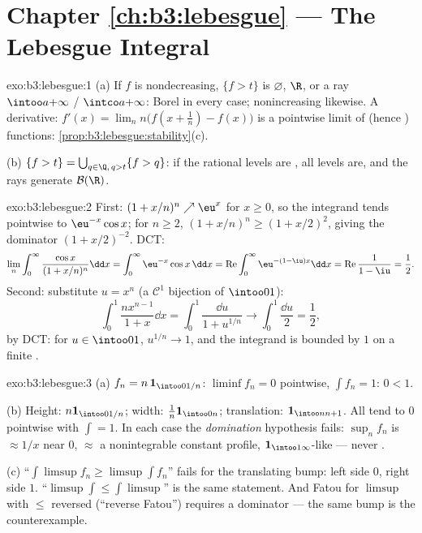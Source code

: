 \section*{Chapter \ref{ch:b3:lebesgue} --- The Lebesgue
Integral}

\begin{solution}{exo:b3:lebesgue:1}
(a) If $f$ is nondecreasing, $\{f > t\}$ is $\varnothing$, $\R$,
or a ray $\intoo a{+\infty}$ / $\intco a{+\infty}$: Borel in
every case; nonincreasing likewise. A derivative: $f'(x) =
\lim_n n\bigl(f(x + \frac1n) - f(x)\bigr)$ is a pointwise limit
of  (hence ) functions:
\cref{prop:b3:lebesgue:stability}(c).

(b) $\{f > t\} = \bigcup_{q \in \Q,\, q > t}\{f > q\}$: if the
rational levels are , all levels are, and the rays
generate $\mathcal B(\R)$.
\end{solution}

\begin{solution}{exo:b3:lebesgue:2}
First: $(1 + x/n)^n \nearrow \eu^x$ for $x \geq 0$, so the
integrand tends pointwise to $\eu^{-x}\cos x$; for $n \geq 2$,
$(1 + x/n)^n \geq (1 + x/2)^2$, giving the  dominator
$(1 + x/2)^{-2}$. DCT:
\[
\lim_n\int_0^\infty\frac{\cos x}{(1 + x/n)^n}\dd x
= \int_0^\infty \eu^{-x}\cos x\,\dd x
= \operatorname{Re}\int_0^\infty\eu^{-(1 - \iu)x}\dd x
= \operatorname{Re}\frac{1}{1 - \iu} = \frac12 .
\]
Second: substitute $u = x^n$ (a $\mathcal C^1$ bijection of
$\intoo01$):
\[
\int_0^1\frac{nx^{n-1}}{1 + x}\dd x = \int_0^1\frac{\dd u}{1 +
u^{1/n}} \longrightarrow \int_0^1\frac{\dd u}{2} = \frac12,
\]
by DCT: for $u \in \intoo01$, $u^{1/n} \to 1$, and the
integrand is bounded by $1$ on a finite .
\end{solution}

\begin{solution}{exo:b3:lebesgue:3}
(a) $f_n = n\,\mathbf 1_{\intoo0{1/n}}$: $\liminf f_n = 0$
pointwise, $\int f_n = 1$: $0 < 1$.

(b) Height: $n\mathbf 1_{\intoo0{1/n}}$; width: $\frac1n\mathbf
1_{\intoo0n}$; translation: $\mathbf 1_{\intoo n{n+1}}$. All
tend to $0$ pointwise with $\int = 1$. In each case the
\emph{domination} hypothesis fails: $\sup_nf_n$ is
$\approx 1/x$ near $0$, $\approx$ a nonintegrable constant
profile, $\mathbf 1_{\intoo1\infty}$-like --- never .

(c) ``$\int\limsup f_n \geq \limsup\int f_n$'' fails for the
translating bump: left side $0$, right side $1$.
``$\limsup\int \leq \int\limsup$'' is the same statement. And
Fatou for $\limsup$ with $\leq$ reversed
(``reverse Fatou'') requires a dominator --- the same bump is
the counterexample.
\end{solution}

